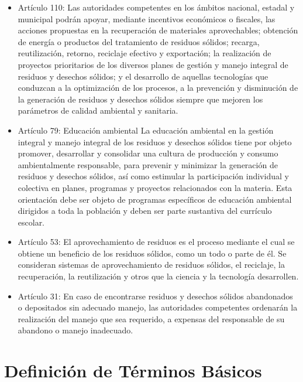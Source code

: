 \begin{itemize}
    \item Artículo 110: Las autoridades competentes en los ámbitos nacional, estadal y municipal podrán apoyar, mediante incentivos económicos o fiscales, las acciones propuestas en la recuperación de materiales aprovechables; obtención de energía o productos del tratamiento de residuos sólidos; recarga, reutilización, retorno, reciclaje efectivo y exportación; la realización de proyectos prioritarios de los diversos planes de gestión y manejo integral de residuos y desechos sólidos; y el desarrollo de aquellas tecnologías que conduzcan a la optimización de los procesos, a la prevención y disminución de la generación de residuos y desechos sólidos siempre que mejoren los parámetros de calidad ambiental y sanitaria.
    
    \item Artículo 79: Educación ambiental La educación ambiental en la gestión integral y manejo integral de los residuos y desechos sólidos tiene por objeto promover, desarrollar y consolidar una cultura de producción y consumo ambientalmente responsable, para prevenir y minimizar la generación de residuos y desechos sólidos, así como estimular la participación individual y colectiva en planes, programas y proyectos relacionados con la materia. Esta orientación debe ser objeto de programas específicos de educación ambiental dirigidos a toda la población y deben ser parte sustantiva del currículo escolar.
    
    \item Artículo 53: El aprovechamiento de residuos es el proceso mediante el cual se obtiene un beneficio de los residuos sólidos, como un todo o parte de él. Se consideran sistemas de aprovechamiento de residuos sólidos, el reciclaje, la recuperación, la reutilización y otros que la ciencia y la tecnología desarrollen.
    
    \item Artículo 31: En caso de encontrarse residuos y desechos sólidos abandonados o depositados sin adecuado manejo, las autoridades competentes ordenarán la realización del manejo que sea requerido, a expensas del responsable de su abandono o manejo inadecuado.
\end{itemize}

\newpage

\section{Definición de Términos Básicos}


